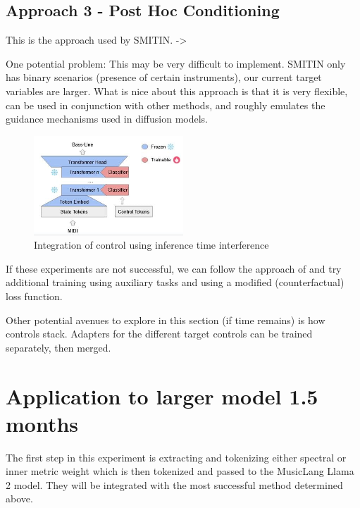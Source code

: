 \subsection{Approach 3 - Post Hoc Conditioning}

This is the approach used by SMITIN\cite{Koo_Wichern_Germain_SMITIN_2024}. -> 

One potential problem: This may be very difficult to implement. SMITIN only has binary scenarios (presence of certain instruments), our current target variables are larger. What is nice about this approach is that it is very flexible, can be used in conjunction with other methods, and roughly emulates the guidance mechanisms used in diffusion models. 

\begin{figure}[H]
    \centering
    \includegraphics[width=0.5\textwidth]{IMAGES/adhoccontrol.jpg} 
    \caption{Integration of control using inference time interference}
    \label{fig:adhoccontrol}
\end{figure}

If these experiments are not successful, we can follow the approach of \cite{Shu_Xu_Musebarcontrol_2024} and try additional training using auxiliary tasks and using a modified (counterfactual) loss function. 

Other potential avenues to explore in this section (if time remains) is how controls stack. Adapters for the different target controls can be trained separately, then merged.  

\section{Application to larger model 1.5 months}

The first step in this experiment is extracting and tokenizing either spectral or inner metric weight which is then tokenized and passed to the MusicLang Llama 2 model. They will be integrated with the most successful method determined above.

